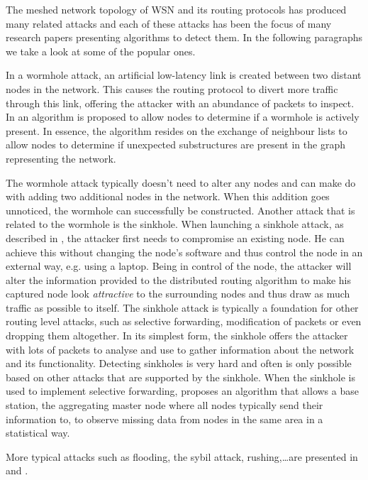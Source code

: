 \documentclass[conference]{IEEEtran}
\begin{document}
The meshed network topology of WSN and its routing protocols has produced many
related attacks and each of these attacks has been the focus of many research
papers presenting algorithms to detect them. In the following paragraphs we
take a look at some of the popular ones.

In a wormhole attack, an artificial low-latency link is created between two
distant nodes in the network. This causes the routing protocol to divert more
traffic through this link, offering the attacker with an abundance of packets
to inspect. In \cite{maheshwari2007detecting} an algorithm is proposed to allow
nodes to determine if a wormhole is actively present. In essence, the algorithm
resides on the exchange of neighbour lists to allow nodes to determine if
unexpected substructures are present in the graph representing the network.

The wormhole attack typically doesn't need to alter any nodes and can make do
with adding two additional nodes in the network. When this addition goes
unnoticed, the wormhole can successfully be constructed. Another attack that is
related to the wormhole is the sinkhole. When launching a sinkhole attack, as
described in \cite{krontiris2008launching}, the attacker first needs to
compromise an existing node. He can achieve this without changing the node's
software and thus control the node in an external way, e.g. using a laptop.
Being in control of the node, the attacker will alter the information provided
to the distributed routing algorithm to make his captured node look
\emph{attractive} to the surrounding nodes and thus draw as much traffic as
possible to itself. The sinkhole attack is typically a foundation for other
routing level attacks, such as selective forwarding, modification of packets or
even dropping them altogether. In its simplest form, the sinkhole offers the
attacker with lots of packets to analyse and use to gather information about
the network and its functionality. Detecting sinkholes is very hard and often
is only possible based on other attacks that are supported by the sinkhole.
When the sinkhole is used to implement selective forwarding,
\cite{ngai2006intruder} proposes an algorithm that allows a base station, the
aggregating master node where all nodes typically send their information to, to
observe missing data from nodes in the same area in a statistical way.

More typical attacks such as flooding, the sybil attack, rushing,\dots are
presented in \cite{wood2002denial} and \cite{djenouri2005survey}.
\end{document}
